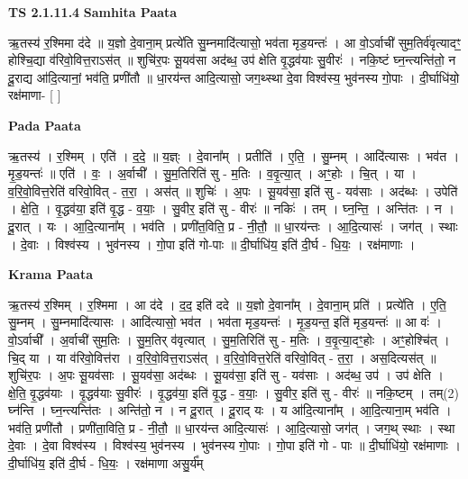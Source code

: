 \documentclass[17pt]{extarticle}
\begin{document}
\textbf{TS 2.1.11.4 } \newline
\textbf{Samhita Paata} \newline

ऋ॒तस्य॑ र॒श्मिमा द॑दे ॥ य॒ज्ञो दे॒वाना॒म् प्रत्ये॑ति सु॒म्नमादि॑त्यासो॒ भव॑ता मृड॒यन्तः॑ । आ वो॒ऽर्वाची॑ सुम॒तिर्व॑वृत्यादꣳ॒॒ होश्चि॒द्या व॑रिवो॒वित्त॒राऽस॑त् ॥ शुचि॑र॒पः सू॒यव॑सा अद॑ब्ध॒ उप॑ क्षेति वृ॒द्धव॑याः सु॒वीरः॑ । नकि॒ष्टं घ्न॒न्त्यन्ति॑तो॒ न दू॒राद्य आ॑दि॒त्यानां॒ भव॑ति॒ प्रणी॑तौ ॥ धा॒रय॑न्त आदि॒त्यासो॒ जग॒थ्स्था दे॒वा विश्व॑स्य॒ भुव॑नस्य गो॒पाः । दी॒र्घाधि॑यो॒ रक्ष॑माणा-  [  ] \newline

\textbf{Pada Paata} \newline

ऋ॒तस्य॑ । र॒श्मिम् । एति॑ । द॒दे॒ ॥ य॒ज्ञ्ः । दे॒वाना᳚म् । प्रतीति॑ । ए॒ति॒ । सु॒म्नम् । आदि॑त्यासः । भव॑त । मृ॒ड॒यन्तः॑ ॥ एति॑ । वः॒ । अ॒र्वाची᳚ । सु॒म॒तिरिति॑ सु - म॒तिः । व॒वृ॒त्या॒त् । अꣳ॒॒होः । चि॒त् । या । व॒रि॒वो॒वित्त॒रेति॑ वरिवो॒वित् - त॒रा॒ । अस॑त् ॥ शुचिः॑ । अ॒पः । सू॒यव॑सा॒ इति॑ सु - यव॑साः । अद॑ब्धः । उपेति॑ । क्षे॒ति॒ । वृ॒द्धव॑या॒ इति॑ वृ॒द्ध - व॒याः॒ । सु॒वीर॒ इति॑ सु - वीरः॑ ॥ नकिः॑ । तम् । घ्न॒न्ति॒ । अन्ति॑तः । न । दू॒रात् । यः । आ॒दि॒त्याना᳚म् । भव॑ति । प्रणी॑त॒विति॒ प्र - नी॒तौ॒ ॥ धा॒रय॑न्तः । आ॒दि॒त्यासः॑ । जग॑त् । स्थाः । दे॒वाः । विश्व॑स्य । भुव॑नस्य । गो॒पा इति॑ गो-पाः ॥ दी॒र्घाधि॑य॒ इति॑ दी॒र्घ - धि॒यः॒ । रक्ष॑माणाः ।  \newline


\textbf{Krama Paata} \newline

ऋ॒तस्य॑ र॒श्मिम् । र॒श्मिमा । आ द॑दे । द॒द॒ इति॑ ददे ॥ य॒ज्ञो दे॒वाना᳚म् । दे॒वाना॒म् प्रति॑ । प्रत्ये॑ति । ए॒ति॒ सु॒म्नम् । सु॒म्नमादि॑त्यासः । आदि॑त्यासो॒ भव॑त । भव॑ता मृड॒यन्तः॑ । मृ॒ड॒यन्त॒ इति॑ मृड॒यन्तः॑ ॥ आ वः॑ । वो॒ऽर्वाची᳚ । अ॒र्वाची॑ सुम॒तिः । सु॒म॒तिर् व॑वृत्यात् । सु॒म॒तिरिति॑ सु - म॒तिः । व॒वृ॒त्या॒दꣳ॒॒होः । अꣳ॒॒होश्चि॑त् । चि॒द् या । या व॑रिवो॒वित्त॑रा । व॒रि॒वो॒वित्त॒राऽस॑त् । व॒रि॒वो॒वित्त॒रेति॑ वरिवो॒वित् - त॒रा॒ । अस॒दित्यस॑त् ॥ शुचि॑र॒पः । अ॒पः सू॒यव॑साः । सू॒यव॑सा॒ अद॑ब्धः । सू॒यव॑सा॒ इति॑ सु - यव॑साः । अद॑ब्ध॒ उप॑ । उप॑ क्षेति । क्षे॒ति॒ वृ॒द्धव॑याः । वृ॒द्धव॑याः सु॒वीरः॑ । वृ॒द्धव॑या॒ इति॑ वृ॒द्ध - व॒याः॒ । सु॒वीर॒ इति॑ सु - वीरः॑ ॥ नकि॒ष्टम् । तम्(2) घ्न॑न्ति । घ्न॒न्त्यन्ति॑तः । अन्ति॑तो॒ न । न दू॒रात् । दू॒राद् यः । य आ॑दि॒त्याना᳚म् । आ॒दि॒त्याना॒म् भव॑ति । भव॑ति॒ प्रणी॑तौ । प्रणी॑ता॒विति॒ प्र - नी॒तौ॒ ॥ धा॒रय॑न्त आदि॒त्यासः॑ । आ॒दि॒त्यासो॒ जग॑त् । जग॒थ् स्थाः । स्था दे॒वाः । दे॒वा विश्व॑स्य । विश्व॑स्य॒ भुव॑नस्य । भुव॑नस्य गो॒पाः । गो॒पा इति॑ गो - पाः ॥ दी॒र्घाधि॑यो॒ रक्ष॑माणाः । दी॒र्घाधि॑य॒ इति॑ दी॒र्घ - धि॒यः॒ । रक्ष॑माणा असु॒र्य᳚म् \newline
\end{document}
